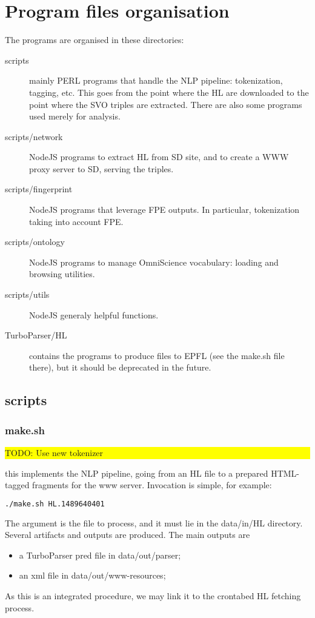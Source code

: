 \documentclass[a4paper,11pt]{report}
\newcommand{\TODO}[1]{\begin{center}\bfseries \colorbox{yellow}{\parbox{0.9\textwidth}{TODO: #1}}\end{center}}
\begin{document}
\section{Program files organisation}
The programs are organised in these directories:
\begin{description}
\item[scripts] mainly PERL programs that handle the NLP pipeline: tokenization, tagging, etc. This goes from the point where the HL are downloaded to the point where the SVO triples are extracted. There are also some programs used merely for analysis.
\item[scripts/network] NodeJS programs to extract HL from SD site, and to create a WWW proxy server to SD, serving the triples.
\item[scripts/fingerprint] NodeJS programs that leverage FPE outputs. In particular, tokenization taking into account FPE.
\item[scripts/ontology] NodeJS programs to manage OmniScience vocabulary: loading and browsing utilities.
\item[scripts/utils] NodeJS generaly helpful functions.
\item[TurboParser/HL] contains the programs to produce files to EPFL (see the make.sh file there), but it should be deprecated in the future.
\end{description}
\subsection{scripts}
\subsubsection{make.sh}
\TODO{Use new tokenizer}
this implements the NLP pipeline, going from an HL file to a prepared HTML-tagged fragments for the www server. Invocation is simple, for example:
%
\begin{lstlisting}[language=bash]
./make.sh HL.1489640401
\end{lstlisting}
%
The argument is the file to process, and it must lie in the data/in/HL directory. Several artifacts and outputs are produced. The main outputs are
%
\begin{itemize}
\item a TurboParser pred file in data/out/parser;
\item an xml file in data/out/www-resources;
\end{itemize}
%
As this is an integrated procedure, we may link it to the crontabed HL fetching process.
%
\end{document}
